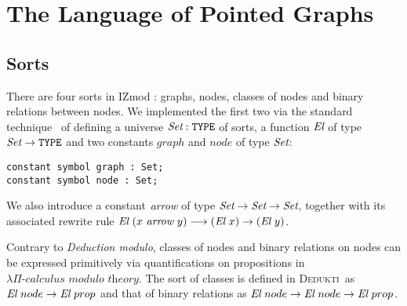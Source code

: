 \documentclass[submission,copyright,creativecommons]{eptcs}
\def\Type{\mbox{\tt TYPE}}
\def\ra{\rightarrow}
\def\lra{\longrightarrow}
\def\Set{\mbox{\it Set}}
\def\El{{\mbox{\it El}}}
\newcommand{\dedukti}{\textsc{Dedukti}}
\newcommand{\lpcm}{$\lambda \Pi\textit{-calculus modulo theory}$}
\def\arr{{\mbox{\it arrow}}}
\begin{document}
\begin{center}
\end{center}

\section{The Language of Pointed Graphs}

\subsection{Sorts}

There are four sorts in IZmod \cite[see Section 3.2]{zermodulo}: graphs, nodes, classes of nodes and binary relations between nodes. We implemented the first two via the standard technique~\cite{theoryU} of defining a universe $\Set:\Type$ of sorts, a function $\El$ of type $\Set \ra \Type$ and two constants $graph$ and $node$ of type $\Set$:
\begin{lstlisting}
constant symbol graph : Set;
constant symbol node : Set;
\end{lstlisting}
We also introduce a constant $\arr $ of type $\Set \ra \Set \ra \Set$, together with its associated rewrite rule $\El~(x~\arr~y) \lra (\El~x) \ra (\El~y)$.

Contrary to \textit{Deduction modulo}, classes of nodes and binary relations on nodes can be expressed primitively via quantifications on propositions in \lpcm. The sort of classes is defined in \dedukti ~as $\El~node \ra \El~prop$ and that of binary relations as $\El~node \ra \El~node \ra \El~prop$.
\end{document}

